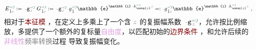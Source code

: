 \begin{subequations}
\begin{align}
		\Xint{\mathcolor{gray}{-}}{30}{E}^{\;\!\mathcolor{gray}{\omega} \textcolor{PineGreen}{\jmath}}_{\;\! \hat{1} \mathcolor{gray}{z}} := \Xint{\begin{smallmatrix} ~ \\ {}^{}_{\mathcolor{gray}{-}} \\ ~ \end{smallmatrix}}{09}{\mathtt{g}}^{\;\!\mathcolor{gray}{\omega} \textcolor{PineGreen}{\jmath}}_{\;\! \mathcolor{gray}{z}} \Xint{\mathcolor{gray}{-}}{20}{G}^{\;\!\mathcolor{gray}{\omega} \textcolor{PineGreen}{\jmath}}_{\;\! \hat{1} \mathcolor{gray}{z}} := \Xint{\begin{smallmatrix} ~ \\ {}^{}_{\mathcolor{gray}{-}} \\ ~ \end{smallmatrix}}{09}{\mathtt{g}}^{\;\!\mathcolor{gray}{\omega} \textcolor{PineGreen}{\jmath}}_{\;\! \mathcolor{gray}{z}} \Xint{{}^{}_{\mathcolor{gray}{-}}}{10}{g}^{\;\!\mathcolor{gray}{\omega} \textcolor{PineGreen}{\jmath}}_{\;\! \hat{1}} \mathbb{e}^{\mathbb{i} \Xint{\begin{smallmatrix} ~ \\ {}^{}_{\mathcolor{gray}{-}} \\ ~ \end{smallmatrix}}{15}{k}_{\symup{z}}^{\;\! \mathcolor{gray}{\omega} \textcolor{PineGreen}{\jmath}} \mathcolor{gray}{z}} =: \Xint{{}^{}_{\mathcolor{gray}{-}}}{10}{g}^{\;\!\mathcolor{gray}{\omega} \textcolor{PineGreen}{\jmath}}_{\;\! \hat{1} \mathcolor{gray}{z}} \mathbb{e}^{\mathbb{i} \Xint{\begin{smallmatrix} ~ \\ {}^{}_{\mathcolor{gray}{-}} \\ ~ \end{smallmatrix}}{15}{k}_{\symup{z}}^{\;\! \mathcolor{gray}{\omega} \textcolor{PineGreen}{\jmath}} \mathcolor{gray}{z}} ~, \label{eq:components-eigenwave}
	\end{align}
\end{subequations}
相对于\textcolor{Maroon}{本征模} ，在定义上多乘上了一个含 $\mathcolor{gray}{z}$ 的\textcolor{PineGreen}{复振幅}系数 $\Xint{\begin{smallmatrix} ~ \\ {}^{}_{\mathcolor{gray}{-}} \\ ~ \end{smallmatrix}}{09}{\mathtt{g}}^{\;\!\mathcolor{gray}{\omega} \textcolor{PineGreen}{\jmath}}_{\;\! \mathcolor{gray}{z}}$，允许按比例缩放，多提供了一个额外的复标量\textcolor{Plum}{自由度}，以匹配初始的\textcolor{Maroon}{边界条件} ，和允许后续的\textcolor{Plum}{非线性}\textcolor{gray}{频率转换}过程  导致\textcolor{PineGreen}{复振幅}变化。

